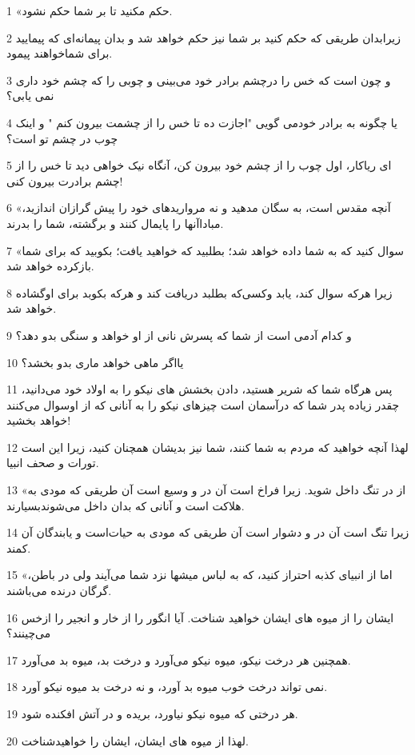 \par 1 «حکم مکنید تا بر شما حکم نشود.
\par 2 زیرابدان طریقی که حکم کنید بر شما نیز حکم خواهد شد و بدان پیمانه‌ای که پیمایید برای شماخواهند پیمود.
\par 3 و چون است که خس را درچشم برادر خود می‌بینی و چوبی را که چشم خود داری نمی یابی؟
\par 4 یا چگونه به برادر خودمی گویی "اجازت ده تا خس را از چشمت بیرون کنم " و اینک چوب در چشم تو است؟
\par 5 ‌ای ریاکار، اول چوب را از چشم خود بیرون کن، آنگاه نیک خواهی دید تا خس را از چشم برادرت بیرون کنی!
\par 6 «آنچه مقدس است، به سگان مدهید و نه مرواریدهای خود را پیش گرازان اندازید، مباداآنها را پایمال کنند و برگشته، شما را بدرند.
\par 7 «سوال کنید که به شما داده خواهد شد؛ بطلبید که خواهید یافت؛ بکوبید که برای شما بازکرده خواهد شد.
\par 8 زیرا هر‌که سوال کند، یابد وکسی‌که بطلبد دریافت کند و هر‌که بکوبد برای اوگشاده خواهد شد.
\par 9 و کدام آدمی است از شما که پسرش نانی از او خواهد و سنگی بدو دهد؟
\par 10 یااگر ماهی خواهد ماری بدو بخشد؟
\par 11 پس هرگاه شما که شریر هستید، دادن بخشش های نیکو را به اولاد خود می‌دانید، چقدر زیاده پدر شما که درآسمان است چیزهای نیکو را به آنانی که از اوسوال می‌کنند خواهد بخشید!
\par 12 لهذا آنچه خواهید که مردم به شما کنند، شما نیز بدیشان همچنان کنید، زیرا این است تورات و صحف انبیا.
\par 13 «از در تنگ داخل شوید. زیرا فراخ است آن در و وسیع است آن طریقی که مودی به هلاکت است و آنانی که بدان داخل می‌شوندبسیارند.
\par 14 زیرا تنگ است آن در و دشوار است آن طریقی که مودی به حیات‌است و یابندگان آن کمند.
\par 15 «اما از انبیای کذبه احتراز کنید، که به لباس میشها نزد شما می‌آیند ولی در باطن، گرگان درنده می‌باشند.
\par 16 ایشان را از میوه های ایشان خواهید شناخت. آیا انگور را از خار و انجیر را ازخس می‌چینند؟
\par 17 همچنین هر درخت نیکو، میوه نیکو می‌آورد و درخت بد، میوه بد می‌آورد.
\par 18 نمی تواند درخت خوب میوه بد آورد، و نه درخت بد میوه نیکو آورد.
\par 19 هر درختی که میوه نیکو نیاورد، بریده و در آتش افکنده شود.
\par 20 لهذا از میوه های ایشان، ایشان را خواهیدشناخت.
